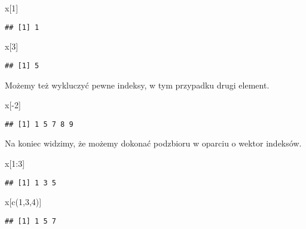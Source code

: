 \documentclass[
]{article}
\newenvironment{Shaded}{\begin{snugshade}}{\end{snugshade}}
\newcommand{\DecValTok}[1]{\textcolor[rgb]{0.00,0.00,0.81}{#1}}
\newcommand{\FunctionTok}[1]{\textcolor[rgb]{0.00,0.00,0.00}{#1}}
\newcommand{\NormalTok}[1]{#1}
\newcommand{\SpecialCharTok}[1]{\textcolor[rgb]{0.00,0.00,0.00}{#1}}
\begin{document}
\begin{Shaded}
\begin{Highlighting}[]
\NormalTok{x[}\DecValTok{1}\NormalTok{]}
\end{Highlighting}
\end{Shaded}

\begin{verbatim}
## [1] 1
\end{verbatim}

\begin{Shaded}
\begin{Highlighting}[]
\NormalTok{x[}\DecValTok{3}\NormalTok{]}
\end{Highlighting}
\end{Shaded}

\begin{verbatim}
## [1] 5
\end{verbatim}

Możemy też wykluczyć pewne indeksy, w tym przypadku drugi element.

\begin{Shaded}
\begin{Highlighting}[]
\NormalTok{x[}\SpecialCharTok{{-}}\DecValTok{2}\NormalTok{]}
\end{Highlighting}
\end{Shaded}

\begin{verbatim}
## [1] 1 5 7 8 9
\end{verbatim}

Na koniec widzimy, że możemy dokonać podzbioru w oparciu o wektor
indeksów.

\begin{Shaded}
\begin{Highlighting}[]
\NormalTok{x[}\DecValTok{1}\SpecialCharTok{:}\DecValTok{3}\NormalTok{]}
\end{Highlighting}
\end{Shaded}

\begin{verbatim}
## [1] 1 3 5
\end{verbatim}

\begin{Shaded}
\begin{Highlighting}[]
\NormalTok{x[}\FunctionTok{c}\NormalTok{(}\DecValTok{1}\NormalTok{,}\DecValTok{3}\NormalTok{,}\DecValTok{4}\NormalTok{)]}
\end{Highlighting}
\end{Shaded}

\begin{verbatim}
## [1] 1 5 7
\end{verbatim}
\end{document}
